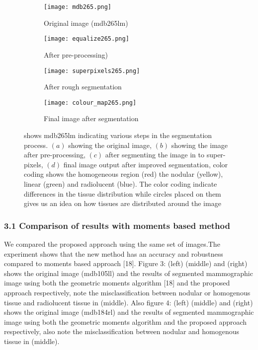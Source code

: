 \documentclass{article}
\begin{document}
\begin{figure}
	\begin{subfigure}{.5\textwidth}
		\centering
		\texttt{[image: mdb265.png]}
		\caption{Original image (mdb265lm)}
		\label{fig:sub1}
	\end{subfigure}
	\begin{subfigure}{.5\textwidth}
		\centering
		\texttt{[image: equalize265.png]}
		\caption{After pre-processing)}
		\label{fig:sub2}
	\end{subfigure}
	\begin{subfigure}{.5\textwidth}
		\centering
		\texttt{[image: superpixels265.png]}
		\caption{After rough segmentation }
		\label{fig:sub3}
	\end{subfigure}
	\begin{subfigure}{.5\textwidth}
		\centering
		\texttt{[image: colour\_map265.png]}
		\caption{Final image after segmentation }
		\label{fig:sub2}
	\end{subfigure}
	\caption{shows mdb265lm indicating various steps in the segmentation process. $(a)$ showing the original image, $(b)$ showing the image after pre-processing, $(c)$ after segmenting the image in to super-pixels, $(d)$ final image output after improved segmentation, color coding shows the homogeneous region (red) the nodular (yellow), linear (green) and radiolucent (blue). The color coding indicate differences in the tissue distribution while circles placed on them gives us an idea on how tissues are distributed around the image}
\end{figure}
\newpage
\subsubsection*{3.1 Comparison of results with moments based method}
We compared the proposed approach using the same set of images.The experiment shows that the new method has an accuracy and robustness compared to moments based approach [18]. Figure 3: (left) (middle) and (right) shows the original image (mdb105ll) and the results of segmented mammographic image using both the geometric moments algorithm [18] and the proposed approach respectively, note the misclassification between nodular or homogenous tissue and radiolucent tissue in (middle). Also figure 4: (left) (middle) and (right) shows the original image (mdb184rl) and the results of segmented mammographic image using both the geometric moments algorithm and the proposed approach respectively, also note the misclassification between nodular and homogenous tissue in (middle).
\end{document}
